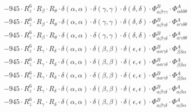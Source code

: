 \documentclass{article}
\begin{document}
\begin{subequations}
\begin{gather}
\begin{array}{c}
 \\[0.2em] 		 - 945 \cdot R_{z}^{6} \cdot R_{\beta{}} \cdot R_{\theta{}} \cdot \delta{}\left(\alpha{}, \alpha{}\right) \cdot \delta{}\left(\gamma{}, \gamma{}\right) \cdot \delta{}\left(\delta{}, \delta{}\right) \cdot \Phi{}^{B}_{\alpha{}\beta{}\gamma{}\gamma{}} \cdot \Phi{}^{A}_{\alpha{}\delta{}\delta{}\theta{}} 
 \\[0.2em] 		 - 945 \cdot R_{z}^{6} \cdot R_{\beta{}} \cdot R_{\theta{}} \cdot \delta{}\left(\alpha{}, \alpha{}\right) \cdot \delta{}\left(\gamma{}, \gamma{}\right) \cdot \delta{}\left(\delta{}, \delta{}\right) \cdot \Phi{}^{B}_{\alpha{}\beta{}\gamma{}\delta{}} \cdot \Phi{}^{A}_{\alpha{}\gamma{}\delta{}\theta{}} 
 \\[0.2em] 		 - 945 \cdot R_{z}^{6} \cdot R_{\beta{}} \cdot R_{\theta{}} \cdot \delta{}\left(\alpha{}, \alpha{}\right) \cdot \delta{}\left(\gamma{}, \gamma{}\right) \cdot \delta{}\left(\delta{}, \delta{}\right) \cdot \Phi{}^{B}_{\alpha{}\beta{}\gamma{}\delta{}} \cdot \Phi{}^{A}_{\alpha{}\gamma{}\delta{}\theta{}} 
 \\[0.2em] 		 - 945 \cdot R_{z}^{6} \cdot R_{\gamma{}} \cdot R_{\delta{}} \cdot \delta{}\left(\alpha{}, \alpha{}\right) \cdot \delta{}\left(\beta{}, \beta{}\right) \cdot \delta{}\left(\epsilon{}, \epsilon{}\right) \cdot \Phi{}^{B}_{\alpha{}\alpha{}\gamma{}\delta{}} \cdot \Phi{}^{A}_{\beta{}\beta{}\epsilon{}\epsilon{}} 
 \\[0.2em] 		 - 945 \cdot R_{z}^{6} \cdot R_{\gamma{}} \cdot R_{\delta{}} \cdot \delta{}\left(\alpha{}, \alpha{}\right) \cdot \delta{}\left(\beta{}, \beta{}\right) \cdot \delta{}\left(\epsilon{}, \epsilon{}\right) \cdot \Phi{}^{B}_{\alpha{}\alpha{}\gamma{}\delta{}} \cdot \Phi{}^{A}_{\beta{}\beta{}\epsilon{}\epsilon{}} 
 \\[0.2em] 		 - 945 \cdot R_{z}^{6} \cdot R_{\gamma{}} \cdot R_{\delta{}} \cdot \delta{}\left(\alpha{}, \alpha{}\right) \cdot \delta{}\left(\beta{}, \beta{}\right) \cdot \delta{}\left(\epsilon{}, \epsilon{}\right) \cdot \Phi{}^{B}_{\alpha{}\alpha{}\gamma{}\delta{}} \cdot \Phi{}^{A}_{\beta{}\beta{}\epsilon{}\epsilon{}} 
 \\[0.2em] 		 - 945 \cdot R_{z}^{6} \cdot R_{\gamma{}} \cdot R_{\delta{}} \cdot \delta{}\left(\alpha{}, \alpha{}\right) \cdot \delta{}\left(\beta{}, \beta{}\right) \cdot \delta{}\left(\epsilon{}, \epsilon{}\right) \cdot \Phi{}^{B}_{\alpha{}\beta{}\gamma{}\delta{}} \cdot \Phi{}^{A}_{\alpha{}\beta{}\epsilon{}\epsilon{}} 
 \\[0.2em] 		 - 945 \cdot R_{z}^{6} \cdot R_{\gamma{}} \cdot R_{\delta{}} \cdot \delta{}\left(\alpha{}, \alpha{}\right) \cdot \delta{}\left(\beta{}, \beta{}\right) \cdot \delta{}\left(\epsilon{}, \epsilon{}\right) \cdot \Phi{}^{B}_{\alpha{}\beta{}\gamma{}\delta{}} \cdot \Phi{}^{A}_{\alpha{}\beta{}\epsilon{}\epsilon{}} 

\end{array}
\end{gather}
\end{subequations}
\end{document}
